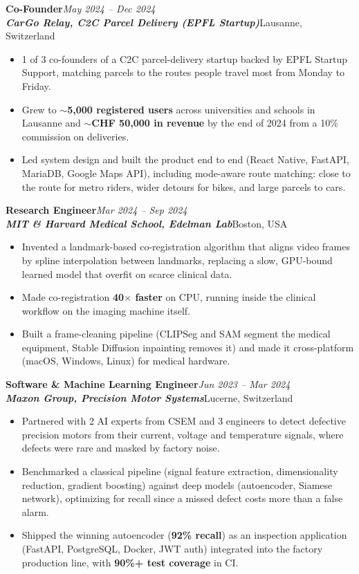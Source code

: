 \documentclass[11pt,a4paper]{article}
\newcommand{\role}[4]{%
  \needspace{5\baselineskip}%
  \noindent\textbf{#1}\hfill\textit{#2}\\
  \textbf{\textit{#3}}\hfill\textcolor{subtle}{#4}\par\vspace{2pt}%
}
\begin{document}
\role{Co-Founder}{May 2024 -- Dec 2024}{CarGo Relay, C2C Parcel Delivery (EPFL Startup)}{Lausanne, Switzerland}
\begin{itemize}
  \item 1 of 3 co-founders of a C2C parcel-delivery startup backed by EPFL Startup Support, matching parcels to the routes people travel most from Monday to Friday.
  \item Grew to \textbf{$\sim$5,000 registered users} across universities and schools in Lausanne and \textbf{$\sim$CHF 50,000 in revenue} by the end of 2024 from a 10\% commission on deliveries.
  \item Led system design and built the product end to end (React Native, FastAPI, MariaDB, Google Maps API), including mode-aware route matching: close to the route for metro riders, wider detours for bikes, and large parcels to cars.
\end{itemize}

\role{Research Engineer}{Mar 2024 -- Sep 2024}{MIT \& Harvard Medical School, Edelman Lab}{Boston, USA}
\begin{itemize}
  \item Invented a landmark-based co-registration algorithm that aligns video frames by spline interpolation between landmarks, replacing a slow, GPU-bound learned model that overfit on scarce clinical data.
  \item Made co-registration \textbf{40$\times$ faster} on CPU, running inside the clinical workflow on the imaging machine itself.
  \item Built a frame-cleaning pipeline (CLIPSeg and SAM segment the medical equipment, Stable Diffusion inpainting removes it) and made it cross-platform (macOS, Windows, Linux) for medical hardware.
\end{itemize}

\role{Software \& Machine Learning Engineer}{Jun 2023 -- Mar 2024}{Maxon Group, Precision Motor Systems}{Lucerne, Switzerland}
\begin{itemize}
  \item Partnered with 2 AI experts from CSEM and 3 engineers to detect defective precision motors from their current, voltage and temperature signals, where defects were rare and masked by factory noise.
  \item Benchmarked a classical pipeline (signal feature extraction, dimensionality reduction, gradient boosting) against deep models (autoencoder, Siamese network), optimizing for recall since a missed defect costs more than a false alarm.
  \item Shipped the winning autoencoder (\textbf{92\% recall}) as an inspection application (FastAPI, PostgreSQL, Docker, JWT auth) integrated into the factory production line, with \textbf{90\%+ test coverage} in CI.
\end{itemize}
\end{document}

